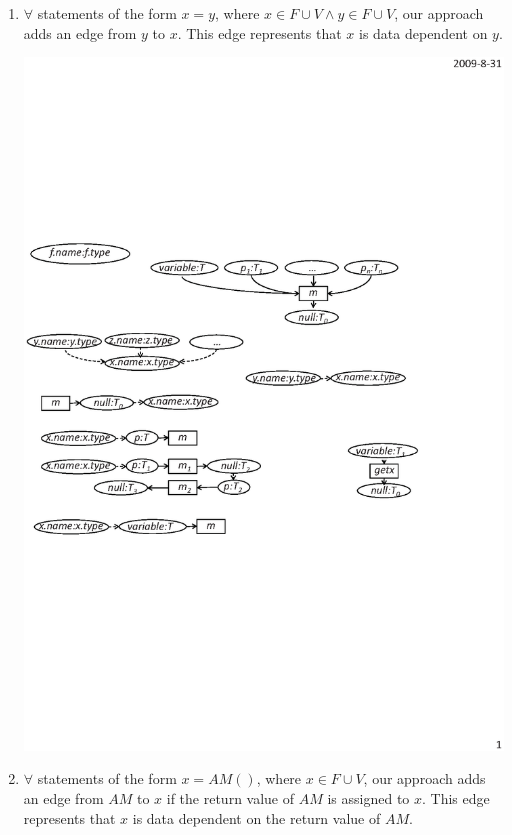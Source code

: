\begin{enumerate}
\item $\forall$ statements of the form $x = y$, where $x \in F \cup V \wedge y \in F \cup V$,
our approach adds an edge from $y$ to $x$.
This edge represents that $x$ is data dependent on $y$.

\begin{center}
\includegraphics[scale=0.7,clip]{figure/rule4.eps}%
\end{center}

\item $\forall$ statements of the form $x = AM()$, where $x \in F \cup V$, our approach
adds an edge from $AM$ to $x$ if the return value of $AM$ is assigned to $x$.
This edge represents that $x$ is data dependent on the return value of $AM$.


\end{enumerate}
